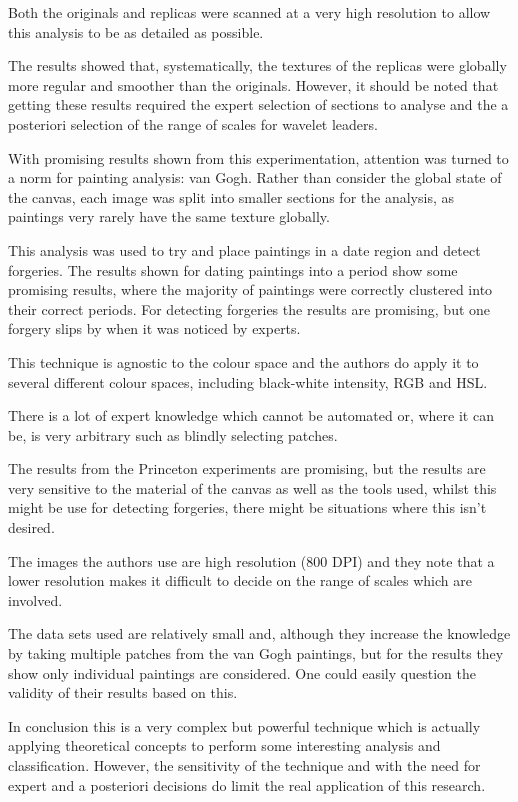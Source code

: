 \documentclass[conference]{IEEEtran}
\begin{document}
Both the originals and replicas were scanned at a very high resolution to allow
this analysis to be as detailed as possible.

The results showed that, systematically, the textures of the replicas were
globally more regular and smoother than the originals. However, it should be
noted that getting these results required the expert selection of sections to
analyse and the a posteriori selection of the range of scales for wavelet
leaders.

With promising results shown from this experimentation, attention was turned to
a norm for painting analysis: van Gogh. Rather than consider the global state
of the canvas, each image was split into smaller sections for the analysis, as
paintings very rarely have the same texture globally.

This analysis was used to try and place paintings in a date region and detect
forgeries. The results shown for dating paintings into a period show some
promising results, where the majority of paintings were correctly clustered
into their correct periods. For detecting forgeries the results are promising,
but one forgery slips by when it was noticed by experts.

This technique is agnostic to the colour space and the authors do apply it to
several different colour spaces, including black-white intensity, \gls{RGB} and
\gls{HSL}.

There is a lot of expert knowledge which cannot be automated or, where it can
be, is very arbitrary such as blindly selecting patches.

The results from the Princeton experiments are promising, but the results are
very sensitive to the material of the canvas as well as the tools used, whilst
this might be use for detecting forgeries, there might be situations where this
isn't desired.

The images the authors use are high resolution (800 DPI) and they note that a
lower resolution makes it difficult to decide on the range of scales which are
involved.

The data sets used are relatively small and, although they increase the
knowledge by taking multiple patches from the van Gogh paintings, but for the
results they show only individual paintings are considered. One could easily
question the validity of their results based on this.

In conclusion this is a very complex but powerful technique which is actually
applying theoretical concepts to perform some interesting analysis and
classification. However, the sensitivity of the technique and with the need for
expert and a posteriori decisions do limit the real application of this
research.
\end{document}
